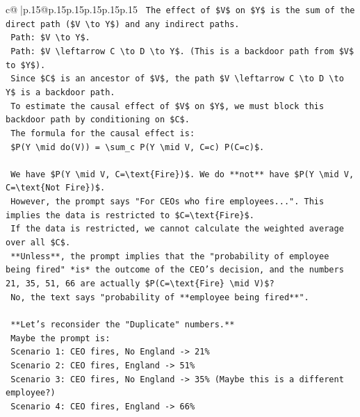 \documentclass{article}
\begin{document}
{\begin{supertabular}{c@{$\;$}|p{.15\linewidth}@{}p{.15\linewidth}p{.15\linewidth}p{.15\linewidth}p{.15\linewidth}p{.15\linewidth}}
{{{\texttt{    The effect of \$V\$ on \$Y\$ is the sum of the direct path (\$V \textbackslash{}to Y\$) and any indirect paths.} \\
\texttt{    Path: \$V \textbackslash{}to Y\$.} \\
\texttt{    Path: \$V \textbackslash{}leftarrow C \textbackslash{}to D \textbackslash{}to Y\$. (This is a backdoor path from \$V\$ to \$Y\$).} \\
\texttt{    Since \$C\$ is an ancestor of \$V\$, the path \$V \textbackslash{}leftarrow C \textbackslash{}to D \textbackslash{}to Y\$ is a backdoor path.} \\
\texttt{    To estimate the causal effect of \$V\$ on \$Y\$, we must block this backdoor path by conditioning on \$C\$.} \\
\texttt{    The formula for the causal effect is:} \\
\texttt{    \$P(Y \textbackslash{}mid do(V)) = \textbackslash{}sum\_c P(Y \textbackslash{}mid V, C=c) P(C=c)\$.} \\
\\ 
\texttt{    We have \$P(Y \textbackslash{}mid V, C=\textbackslash{}text\{Fire\})\$. We do **not** have \$P(Y \textbackslash{}mid V, C=\textbackslash{}text\{Not Fire\})\$.} \\
\texttt{    However, the prompt says "For CEOs who fire employees...". This implies the data is restricted to \$C=\textbackslash{}text\{Fire\}\$.} \\
\texttt{    If the data is restricted, we cannot calculate the weighted average over all \$C\$.} \\
\texttt{    **Unless**, the prompt implies that the "probability of employee being fired" *is* the outcome of the CEO's decision, and the numbers 21, 35, 51, 66 are actually \$P(C=\textbackslash{}text\{Fire\} \textbackslash{}mid V)\$?} \\
\texttt{    No, the text says "probability of **employee being fired**".} \\
\\ 
\texttt{    **Let's reconsider the "Duplicate" numbers.**} \\
\texttt{    Maybe the prompt is:} \\
\texttt{    Scenario 1: CEO fires, No England {-}> 21\%} \\
\texttt{    Scenario 2: CEO fires, England {-}> 51\%} \\
\texttt{    Scenario 3: CEO fires, No England {-}> 35\% (Maybe this is a different employee?)} \\
\texttt{    Scenario 4: CEO fires, England {-}> 66\%} \\
}}}
\end{supertabular}}
\end{document}

